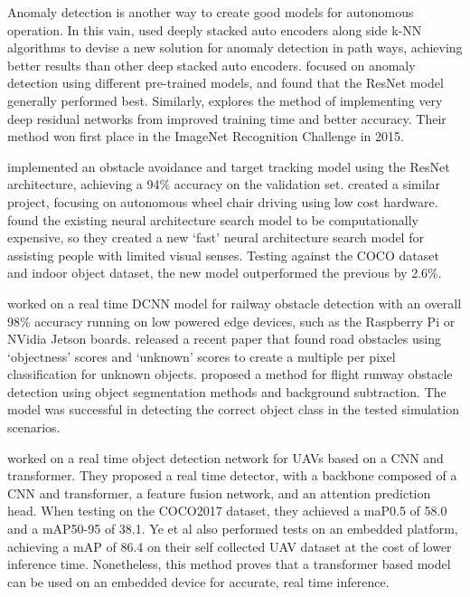 \documentclass[stu,12pt,floatsintext]{apa7}
\begin{document}
Anomaly detection is another way to create good models for autonomous operation. In this vain, \textcite{dairi_obstacle_2018} used deeply stacked auto encoders along side k-NN algorithms to devise a new solution for anomaly detection in path ways, achieving better results than other deep stacked auto encoders. \textcite{wenning_anomaly_2022} focused on anomaly detection using different pre-trained models, and found that the ResNet model generally performed best. Similarly, \textcite{he_deep_2016} explores the method of implementing very deep residual networks from improved training time and better accuracy. Their method won first place in the ImageNet Recognition Challenge in 2015.

\textcite{fang_computer_2021} implemented an obstacle avoidance and target tracking model using the ResNet architecture, achieving a 94\% accuracy on the validation set. \textcite{farheen_object_2022} created a similar project, focusing on autonomous wheel chair driving using low cost hardware. \textcite{said_obstacle_2023} found the existing neural architecture search model to be computationally expensive, so they created a new `fast' neural architecture search model for assisting people with limited visual senses. Testing against the COCO dataset and indoor object dataset, the new model outperformed the previous by 2.6\%.

\textcite{jenefa_real-time_2023} worked on a real time DCNN model for railway obstacle detection with an overall 98\% accuracy running on low powered edge devices, such as the Raspberry Pi or NVidia Jetson boards. \textcite{noguchi_road_2024} released a recent paper that found road obstacles using `objectness' scores and `unknown' scores to create a multiple per pixel classification for unknown objects. \textcite{andreev_runway_2021} proposed a method for flight runway obstacle detection using object segmentation methods and background subtraction. The model was successful in detecting the correct object class in the tested simulation scenarios.

\textcite{ye_real-time_2023} worked on a real time object detection network for UAVs based on a CNN and transformer. They proposed a real time detector, with a backbone composed of a CNN and transformer, a feature fusion network, and an attention prediction head. When testing on the COCO2017 dataset, they achieved a maP0.5 of 58.0 and a mAP50-95 of 38.1. Ye et al also performed tests on an embedded platform, achieving a mAP of 86.4 on their self collected UAV dataset at the cost of lower inference time. Nonetheless, this method proves that a transformer based model can be used on an embedded device for accurate, real time inference.
\end{document}

